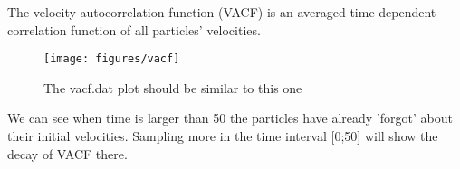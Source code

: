 \documentclass[
paper=a4,                       %
fontsize=11pt,                  %
twoside,                        %
footsepline,                    %
headsepline,                    %
headinclude=false,              %
footinclude=false,              %
pagesize,                       %
]{scrartcl}
\newtheorem{task}{Task}
\begin{document}
\newpage

The velocity autocorrelation function (VACF) is an averaged time dependent correlation function of all particles' 
velocities. 

\vspace{1cm}
\vspace{1cm}

\begin{figure}[ht]
\begin{center}
\texttt{[image: figures/vacf]}
\label{fig:vacf}
\caption{The vacf.dat plot should be similar to this one}
\end{center}
\end{figure}

\noindent We can see when time is larger than 50 the particles have already 'forgot' about their initial
velocities. Sampling more in the time interval [0;50] will show the decay of VACF there.

\newpage



\end{document}
